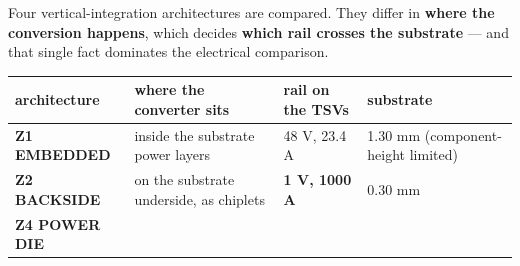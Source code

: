 \documentclass[10pt,]{article}
\begin{document}
Four vertical-integration architectures are compared. They differ in
\textbf{where the conversion happens}, which decides \textbf{which rail
crosses the substrate} --- and that single fact dominates the electrical
comparison.

\begin{longtable}[]{@{}llll@{}}
\toprule
\begin{minipage}[b]{0.22\columnwidth}\raggedright
architecture\strut
\end{minipage} & \begin{minipage}[b]{0.22\columnwidth}\raggedright
where the converter sits\strut
\end{minipage} & \begin{minipage}[b]{0.22\columnwidth}\raggedright
rail on the TSVs\strut
\end{minipage} & \begin{minipage}[b]{0.22\columnwidth}\raggedright
substrate\strut
\end{minipage}\tabularnewline
\midrule
\endhead
\begin{minipage}[t]{0.22\columnwidth}\raggedright
\textbf{Z1 EMBEDDED}\strut
\end{minipage} & \begin{minipage}[t]{0.22\columnwidth}\raggedright
inside the substrate power layers\strut
\end{minipage} & \begin{minipage}[t]{0.22\columnwidth}\raggedright
48 V, 23.4 A\strut
\end{minipage} & \begin{minipage}[t]{0.22\columnwidth}\raggedright
1.30 mm (component-height limited)\strut
\end{minipage}\tabularnewline
\begin{minipage}[t]{0.22\columnwidth}\raggedright
\textbf{Z2 BACKSIDE}\strut
\end{minipage} & \begin{minipage}[t]{0.22\columnwidth}\raggedright
on the substrate underside, as chiplets\strut
\end{minipage} & \begin{minipage}[t]{0.22\columnwidth}\raggedright
\textbf{1 V, 1000 A}\strut
\end{minipage} & \begin{minipage}[t]{0.22\columnwidth}\raggedright
0.30 mm\strut
\end{minipage}\tabularnewline
\begin{minipage}[t]{0.22\columnwidth}\raggedright
\textbf{Z4 POWER DIE}\strut

\end{minipage}
\end{longtable}
\end{document}
